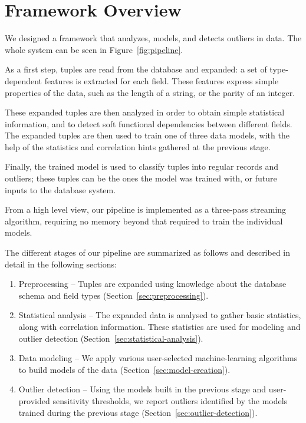 \section{Framework Overview}
\label{sec:overview}

We designed a framework that analyzes, models, and detects outliers in data.
The whole system can be seen in Figure~\ref{fig:pipeline}.

\begin{figure*}
  \centering %
  \caption{Framework pipeline}
  \label{fig:pipeline}
\end{figure*}

As a first step, tuples are read from the database and expanded: a set of type-dependent features is extracted for each field. These features express simple properties of the data, such as the length of a string, or the parity of an integer.

These expanded tuples are then analyzed in order to obtain simple statistical information, and to detect soft functional dependencies between different fields. The expanded tuples are then used to train one of three data models, with the help of the  statistics and correlation hints gathered at the previous stage.

Finally, the trained model is used to classify tuples into regular records and outliers; these tuples can be the ones the model was trained with, or future inputs to the database system.

From a high level view, our pipeline is implemented as a three-pass streaming algorithm, requiring no memory beyond that required to train the individual models.

The different stages of our pipeline are summarized as follows and described in detail in the following sections:

\begin{enumerate}
\item Preprocessing -- Tuples are expanded using knowledge about the database schema and field types (Section~\ref{sec:preprocessing}).
\item Statistical analysis -- The expanded data is analysed to gather basic statistics, along with correlation information. These statistics are used for modeling and outlier detection (Section~\ref{sec:statistical-analysis}).
\item Data modeling -- We apply various user-selected machine-learning algorithms to build models of the data (Section~\ref{sec:model-creation}).
\item Outlier detection -- Using the models built in the previous stage and user-provided sensitivity thresholds, we report outliers identified by the models trained during the previous stage (Section~\ref{sec:outlier-detection}).
\end{enumerate}
